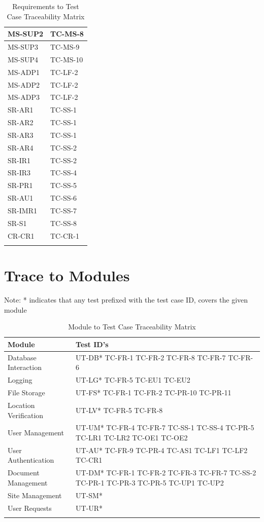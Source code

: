 \documentclass[12pt, titlepage]{article}
\begin{document}
\begin{longtable}{|l|l|}
  MS-SUP2 & TC-MS-8 \\ \hline
  MS-SUP3 & TC-MS-9 \\ \hline
  MS-SUP4 & TC-MS-10 \\ \hline
  MS-ADP1 & TC-LF-2 \\ \hline
  MS-ADP2 & TC-LF-2 \\ \hline
  MS-ADP3 & TC-LF-2 \\ \hline
  SR-AR1 & TC-SS-1 \\ \hline
  SR-AR2 & TC-SS-1 \\ \hline
  SR-AR3 & TC-SS-1 \\ \hline
  SR-AR4 & TC-SS-2 \\ \hline
  SR-IR1 & TC-SS-2 \\ \hline
  SR-IR3 & TC-SS-4 \\ \hline
  SR-PR1 & TC-SS-5\\ \hline
  SR-AU1 & TC-SS-6 \\ \hline
  SR-IMR1 & TC-SS-7 \\ \hline
  SR-S1 & TC-SS-8 \\ \hline
  CR-CR1 & TC-CR-1 \\ \hline
  \caption{Requirements to Test Case Traceability Matrix}
\end{longtable}

\section{Trace to Modules}

Note: * indicates that any test prefixed with the test case ID,
covers the given module

\begin{longtable}{|m{5cm}|m{9cm}|}
  \hline
  \textbf{Module} & \textbf{Test ID's} \\
  \hline
  Database Interaction & UT-DB* TC-FR-1 TC-FR-2 TC-FR-8 TC-FR-7 TC-FR-6\\ \hline
  Logging & UT-LG* TC-FR-5 TC-EU1 TC-EU2\\ \hline
  File Storage & UT-FS* TC-FR-1 TC-FR-2 TC-PR-10 TC-PR-11\\ \hline
  Location Verification & UT-LV* TC-FR-5 TC-FR-8\\ \hline
  User Management & UT-UM* TC-FR-4 TC-FR-7 TC-SS-1 TC-SS-4 TC-PR-5
  TC-LR1 TC-LR2 TC-OE1 TC-OE2 \\ \hline
  User Authentication & UT-AU* TC-FR-9 TC-PR-4 TC-AS1 TC-LF1 TC-LF2
  TC-CR1\\ \hline
  Document Management & UT-DM* TC-FR-1 TC-FR-2 TC-FR-3 TC-FR-7
  TC-SS-2 TC-PR-1 TC-PR-3 TC-PR-5 TC-UP1 TC-UP2\\ \hline
  Site Management & UT-SM*\\ \hline
  User Requests & UT-UR*\\ \hline
  \caption{Module to Test Case Traceability Matrix}
\end{longtable}
\end{document}
